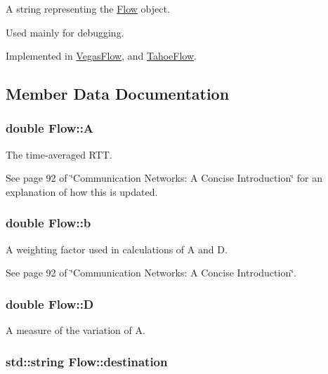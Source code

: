 \-A string representing the \hyperlink{classFlow}{\-Flow} object. 

\-Used mainly for debugging. 

\-Implemented in \hyperlink{classVegasFlow_a1317fffc95555ef997389831a7be8160}{\-Vegas\-Flow}, and \hyperlink{classTahoeFlow_a909ca813661c4ab08dee03a3985a16c9}{\-Tahoe\-Flow}.



\subsection{\-Member \-Data \-Documentation}
\hypertarget{classFlow_a9cb60750432baab4af8b8481fd97aa31}{
\subsubsection[{\-A}]{\setlength{\rightskip}{0pt plus 5cm}double {\bf \-Flow\-::\-A}}}\label{classFlow_a9cb60750432baab4af8b8481fd97aa31}


\-The time-\/averaged \-R\-T\-T. 

\-See page 92 of \char`\"{}\-Communication Networks\-: A 
 Concise Introduction\char`\"{} for an explanation of how this is updated. \hypertarget{classFlow_a22a30218ebecf663beea5902199a5453}{
\subsubsection[{b}]{\setlength{\rightskip}{0pt plus 5cm}double {\bf \-Flow\-::b}}}\label{classFlow_a22a30218ebecf663beea5902199a5453}


\-A weighting factor used in calculations of \-A and \-D. 

\-See page 92 of \char`\"{}\-Communication Networks\-: A Concise Introduction\char`\"{}. \hypertarget{classFlow_a6ffa8765220cfbfcf8b358bcbfd8bc4d}{
\subsubsection[{\-D}]{\setlength{\rightskip}{0pt plus 5cm}double {\bf \-Flow\-::\-D}}}\label{classFlow_a6ffa8765220cfbfcf8b358bcbfd8bc4d}


\-A measure of the variation of \-A. 

\hypertarget{classFlow_a536685c38def6cf8b61d0fb0d7e8372d}{
\subsubsection[{destination}]{\setlength{\rightskip}{0pt plus 5cm}std\-::string {\bf \-Flow\-::destination}}}\label{classFlow_a536685c38def6cf8b61d0fb0d7e8372d}



